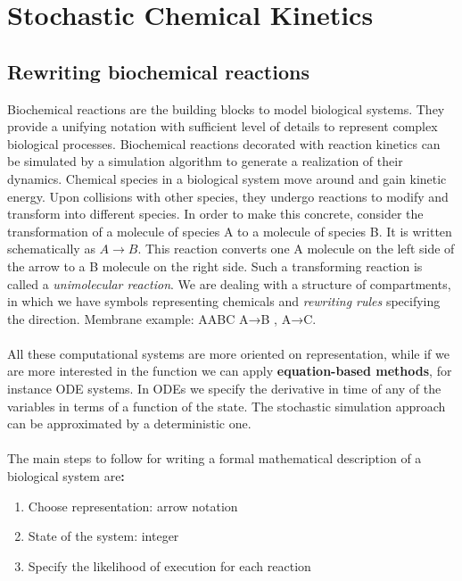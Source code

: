 \graphicspath{{chapters/02/images/}}
\chapter{Stochastic Chemical Kinetics}

\section{Rewriting biochemical reactions}
Biochemical reactions are the building blocks to model biological systems.
They provide a unifying notation with sufficient level of details to represent complex biological processes.
Biochemical reactions decorated with reaction kinetics can be simulated by a simulation algorithm to generate a realization of their dynamics.
Chemical species in a biological system move around and gain kinetic energy.
Upon collisions with other species, they undergo reactions to modify and transform into different species.
In order to make this concrete, consider the transformation of a molecule of species A to a molecule of species B.
It is written schematically as $A \rightarrow B$.
This reaction converts one A molecule on the left side of the arrow to a B molecule on the right side.
Such a transforming reaction is called a \emph{unimolecular reaction}.
We are dealing with a structure of compartments, in which we have symbols representing chemicals and \emph{rewriting rules} specifying the direction.
Membrane example: AABC A→B , A→C.
\\
\\
\noindent
All these computational systems are more oriented on representation, while if we are more interested in the function we can apply \textbf{equation-based methods}, for instance ODE systems.
In ODEs we specify the derivative in time of any of the variables in terms of a function of the state.
The stochastic simulation approach can be approximated by a deterministic one.
\\
\\
\noindent
The main steps to follow for writing a formal mathematical description of a biological system are\textbf{:}

\begin{enumerate}
  \def\labelenumi{\arabic{enumi}.}
  \item Choose representation: arrow notation
  \item State of the system: integer
  \item Specify the likelihood of execution for each reaction
\end{enumerate}

